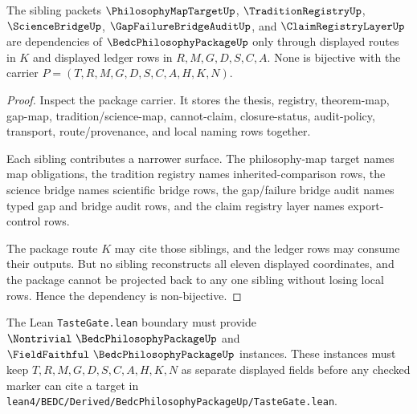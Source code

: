 \begin{theorem}
\label{thm:bedc-philosophy-package-sibling-independence}
The sibling packets $\PhilosophyMapTargetUp$, $\TraditionRegistryUp$, $\ScienceBridgeUp$, $\GapFailureBridgeAuditUp$, and $\ClaimRegistryLayerUp$ are dependencies of $\BedcPhilosophyPackageUp$ only through displayed routes in $K$ and displayed ledger rows in $R,M,G,D,S,C,A$. None is bijective with the carrier $P=(T,R,M,G,D,S,C,A,H,K,N)$.
\end{theorem}
\begin{proof}
Inspect the package carrier. It stores the thesis, registry, theorem-map, gap-map, tradition/science-map, cannot-claim, closure-status, audit-policy, transport, route/provenance, and local naming rows together.

Each sibling contributes a narrower surface. The philosophy-map target names map obligations, the tradition registry names inherited-comparison rows, the science bridge names scientific bridge rows, the gap/failure bridge audit names typed gap and bridge audit rows, and the claim registry layer names export-control rows.

The package route $K$ may cite those siblings, and the ledger rows may consume their outputs. But no sibling reconstructs all eleven displayed coordinates, and the package cannot be projected back to any one sibling without losing local rows. Hence the dependency is non-bijective.
\end{proof}



The Lean \texttt{TasteGate.lean} boundary must provide $\Nontrivial\ \BedcPhilosophyPackageUp$ and $\FieldFaithful\ \BedcPhilosophyPackageUp$ instances. These instances must keep $T,R,M,G,D,S,C,A,H,K,N$ as separate displayed fields before any checked marker can cite a target in \texttt{lean4/BEDC/Derived/BedcPhilosophyPackageUp/TasteGate.lean}.

